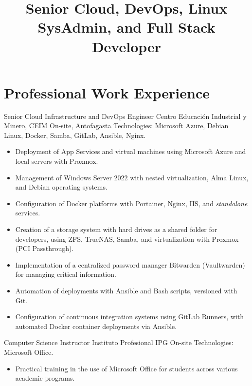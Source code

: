 \documentclass[12pt,letterpaper,sans]{moderncv}
\title {Senior Cloud, DevOps, Linux SysAdmin, and Full Stack Developer}
\begin{document}
\makecvtitle

\section{Professional Work Experience}

{Senior Cloud Infrastructure and DevOps Engineer}
{Centro Educación Industrial y Minero, CEIM}
{\newline On-site, Antofagasta}
{\newline Technologies: Microsoft Azure, Debian Linux, Docker, Samba, GitLab, Ansible, Nginx.}
{
  \begin{itemize}
    \item Deployment of App Services and virtual machines using Microsoft Azure and local servers with Proxmox.
    \item Management of Windows Server 2022 with nested virtualization, Alma Linux, and Debian operating systems.
    \item Configuration of Docker platforms with Portainer, Nginx, IIS, and \textit{standalone} services.
    \item Creation of a storage system with hard drives as a shared folder for developers, using ZFS, TrueNAS, Samba, and virtualization with Proxmox (PCI Passthrough).
    \item Implementation of a centralized password manager Bitwarden (Vaultwarden) for managing critical information.
    \item Automation of deployments with Ansible and Bash scripts, versioned with Git.
    \item Configuration of continuous integration systems using GitLab Runners, with automated Docker container deployments via Ansible.
  \end{itemize}
}
\vspace{0.5em}

{Computer Science Instructor}
{Instituto Profesional IPG}
{\newline On-site}
{\newline Technologies: Microsoft Office.}
{
  \begin{itemize}
    \item Practical training in the use of Microsoft Office for students across various academic programs.
  \end{itemize}
}
\vspace{0.5em}
\end{document}
